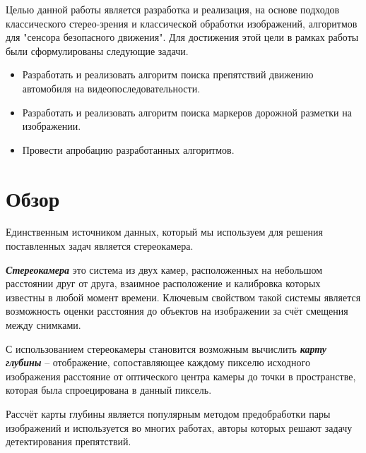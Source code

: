 \documentclass[aps,%
14pt,%
final,%
oneside,
onecolumn,%
musixtex, %
superscriptaddress,%
centertags]{extarticle} %
\begin{document}
Целью данной работы является разработка и реализация, на основе подходов классического стерео-зрения и классической обработки изображений, алгоритмов для "сенсора безопасного движения".
Для достижения этой цели в рамках работы были сформулированы следующие задачи.
\begin{itemize}
    \item Разработать и реализовать алгоритм поиска препятствий движению автомобиля на видеопоследовательности.
    \item Разработать и реализовать алгоритм поиска маркеров дорожной разметки на изображении.
    \item Провести апробацию разработанных алгоритмов.
\end{itemize}

\section{Обзор}

Единственным источником данных, который мы используем для решения поставленных задач является стереокамера.

\textbf{\textit{Стереокамера}} это система из двух камер, расположенных на небольшом расстоянии друг от друга, взаимное расположение и калибровка которых известны в любой момент времени. Ключевым свойством такой системы является возможность оценки расстояния до объектов на изображении за счёт смещения между снимками.

С использованием стереокамеры становится возможным вычислить \textbf{\textit{карту глубины}} -- отображение, сопоставляющее каждому пикселю исходного изображения расстояние от оптического центра камеры до точки в пространстве, которая была спроецирована в данный пиксель.

Рассчёт карты глубины является популярным методом предобработки пары изображений и используется во многих работах, авторы которых решают задачу детектирования препятствий. 









\end{document}
